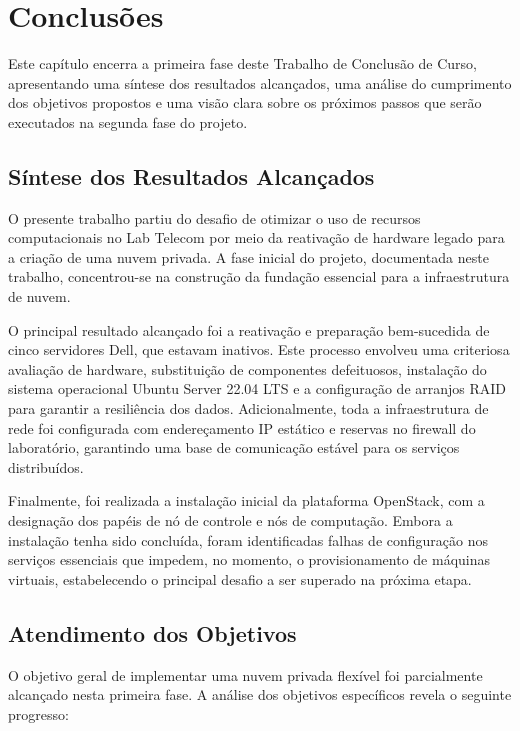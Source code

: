 \chapter{Conclusões}

Este capítulo encerra a primeira fase deste Trabalho de Conclusão de Curso, apresentando uma síntese dos resultados alcançados, uma análise do cumprimento dos objetivos propostos e uma visão clara sobre os próximos passos que serão executados na segunda fase do projeto.

\section{Síntese dos Resultados Alcançados}

O presente trabalho partiu do desafio de otimizar o uso de recursos computacionais no Lab Telecom por meio da reativação de hardware legado para a criação de uma nuvem privada. A fase inicial do projeto, documentada neste trabalho, concentrou-se na construção da fundação essencial para a infraestrutura de nuvem.

O principal resultado alcançado foi a reativação e preparação bem-sucedida de cinco servidores Dell, que estavam inativos. Este processo envolveu uma criteriosa avaliação de hardware, substituição de componentes defeituosos, instalação do sistema operacional Ubuntu Server 22.04 LTS e a configuração de arranjos RAID para garantir a resiliência dos dados. Adicionalmente, toda a infraestrutura de rede foi configurada com endereçamento IP estático e reservas no firewall do laboratório, garantindo uma base de comunicação estável para os serviços distribuídos.

Finalmente, foi realizada a instalação inicial da plataforma OpenStack, com a designação dos papéis de nó de controle e nós de computação. Embora a instalação tenha sido concluída, foram identificadas falhas de configuração nos serviços essenciais que impedem, no momento, o provisionamento de máquinas virtuais, estabelecendo o principal desafio a ser superado na próxima etapa.

\section{Atendimento dos Objetivos}

O objetivo geral de implementar uma nuvem privada flexível foi parcialmente alcançado nesta primeira fase. A análise dos objetivos específicos revela o seguinte progresso:

